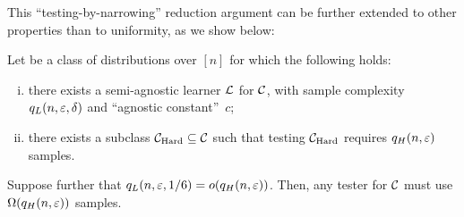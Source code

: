 This ``testing-by-narrowing'' reduction argument can be further extended to other properties than to uniformity, as we show below:
\begin{theorem}\label{theo:main:testing:lb}
Let \class be a class of distributions over $[n]$ for which the following holds:
\begin{enumerate}[(i)]
  \item there exists a semi-agnostic learner $\mathcal{L}$ for $\mathcal{C}$, with sample complexity $q_L(n,\varepsilon, \delta)$ and ``agnostic constant''~$c$;
  \item there exists a subclass $\mathcal{C}_{\rm Hard}\subseteq\mathcal{C}$ such that testing $\mathcal{C}_{\rm Hard}$ requires $q_H(n,\varepsilon)$ samples.
\end{enumerate}
Suppose further that $q_L(n,\eps, 1/6)=\littleO{q_H(n,\eps)}$. Then, any tester for $\mathcal{C}$ must use $\bigOmega{q_H(n,\eps)}$ samples.
\end{theorem}
